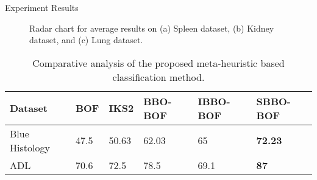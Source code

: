 \documentclass [9pt,times] {beamer}
\begin{document}
\begin{frame}{Experiment Results}
\begin{figure}
\centering
{}
 \caption{Radar chart for average results on (a) Spleen dataset, (b) Kidney dataset, and (c) Lung dataset.}
\label{fig:T3}
\end{figure}

 \begin{table}
\center
\scriptsize
    \caption{Comparative analysis of the proposed meta-heuristic  based classification method.}
    \label{tab:perfor}
    
\renewcommand{\arraystretch}{1}
\begin{tabular}{|p{0.55in}|p{0.51in}|p{0.55in}|p{0.55in}|p{0.55in}|p{0.6in}|}

    \hline
  Dataset    &        BOF    &    IKS2    &    BBO-BOF    &    IBBO-BOF    &    SBBO-BOF    \\
 \hline
Blue Histology 	&            47.5    &    50.63    &    62.03 & 65       &\textbf{    72.23    }\\
ADL &70.6 & 72.5&78.5 & 69.1&\textbf{   87  } \\
\hline
\end{tabular}
\end{table}



\end{frame}

%
%
%
%
%
%
%
\end{document}
